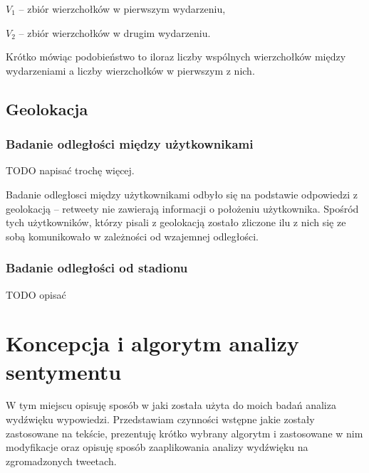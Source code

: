 $V_1$ -- zbiór wierzchołków w pierwszym wydarzeniu,

$V_2$ -- zbiór wierzchołków w drugim wydarzeniu.

Krótko mówiąc podobieństwo to iloraz liczby wspólnych wierzchołków między 
wydarzeniami a liczby wierzchołków w pierwszym z nich.








\subsection{Geolokacja}
\subsubsection{Badanie odległości między użytkownikami}
\label{subsubsection:badanieodleglosci}
TODO napisać trochę więcej.

Badanie odległosci między użytkownikami odbyło się na podstawie odpowiedzi z
geolokacją -- retweety nie zawierają informacji o położeniu użytkownika.
Spośród tych użytkowników, którzy pisali z geolokacją zostało zliczone ilu z
nich się ze sobą komunikowało w zależności od wzajemnej odległości.






\subsubsection{Badanie odległości od stadionu}
\label{subsubsection:badanieodleglosciodstadionu}
TODO opisać 














\section{Koncepcja i algorytm analizy sentymentu}
\label{section:koncepcjaialgorytmanalizysentymentu}

W tym miejscu opisuję sposób w jaki została użyta do moich badań analiza
wydźwięku wypowiedzi. Przedstawiam czynności wstępne jakie zostały zastosowane
na tekście, prezentuję krótko wybrany algorytm i zastosowane w nim modyfikacje
oraz opisuję sposób zaaplikowania analizy wydźwięku na zgromadzonych tweetach.

